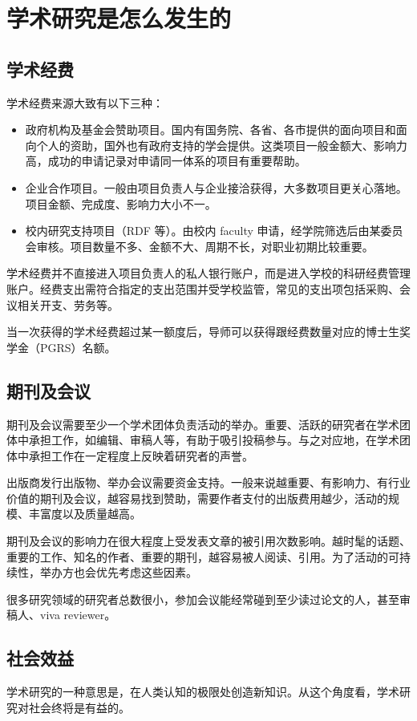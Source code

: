 \section{学术研究是怎么发生的}
\label{section.how-research-works}

\subsection{学术经费}
学术经费来源大致有以下三种：
\begin{itemize}
    \item 政府机构及基金会赞助项目。国内有国务院、各省、各市提供的面向项目和面向个人的资助，国外也有政府支持的学会提供。这类项目一般金额大、影响力高，成功的申请记录对申请同一体系的项目有重要帮助。
    \item 企业合作项目。一般由项目负责人与企业接洽获得，大多数项目更关心落地。项目金额、完成度、影响力大小不一。
    \item 校内研究支持项目（RDF 等）。由校内 faculty 申请，经学院筛选后由某委员会审核。项目数量不多、金额不大、周期不长，对职业初期比较重要。
\end{itemize}

学术经费并不直接进入项目负责人的私人银行账户，而是进入学校的科研经费管理账户。经费支出需符合指定的支出范围并受学校监管，常见的支出项包括采购、会议相关开支、劳务等。

当一次获得的学术经费超过某一额度后，导师可以获得跟经费数量对应的博士生奖学金（PGRS）名额。


\subsection{期刊及会议}
期刊及会议需要至少一个学术团体负责活动的举办。重要、活跃的研究者在学术团体中承担工作，如编辑、审稿人等，有助于吸引投稿参与。与之对应地，在学术团体中承担工作在一定程度上反映着研究者的声誉。

出版商发行出版物、举办会议需要资金支持。一般来说越重要、有影响力、有行业价值的期刊及会议，越容易找到赞助，需要作者支付的出版费用越少，活动的规模、丰富度以及质量越高。

期刊及会议的影响力在很大程度上受发表文章的被引用次数影响。越时髦的话题、重要的工作、知名的作者、重要的期刊，越容易被人阅读、引用。为了活动的可持续性，举办方也会优先考虑这些因素。

很多研究领域的研究者总数很小，参加会议能经常碰到至少读过论文的人，甚至审稿人、viva reviewer。


\subsection{社会效益}
学术研究的一种意思是，在人类认知的极限处创造新知识。从这个角度看，学术研究对社会终将是有益的。


